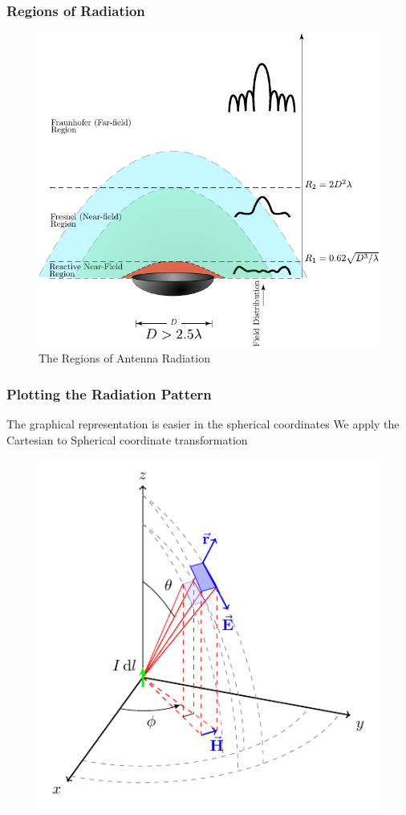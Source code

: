 \documentclass[10pt, compress]{beamer}
\begin{document}
\begin{frame}
  \frametitle{Regions of Radiation}
  \begin{figure}[t!]
    \centering
    \includegraphics[width=.7\textwidth]{src/antenna_rregions.pdf}
    \caption{The Regions of Antenna Radiation}
  \end{figure}
\end{frame}


\begin{frame}
  \frametitle{Plotting the Radiation Pattern}
  \begin{outline}
    \1 The graphical representation is easier in the spherical coordinates
    \1 We apply the Cartesian to Spherical coordinate transformation
  \end{outline}
  \begin{figure}
    \centering
    \includegraphics[width=.6\textwidth]{3dcoord.pdf}
  \end{figure}
\end{frame}
\end{document}

